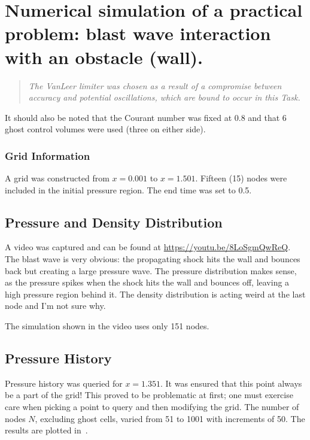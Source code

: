 
\section{Numerical simulation of a practical problem: blast wave interaction with an obstacle (wall).}

\begin{quote}
\em \centering The VanLeer limiter was chosen as a result of a compromise between accuracy and potential oscillations, which are bound to occur in this Task.
\end{quote}
It should also be noted that the Courant number was fixed at 0.8 and that 6 ghost control volumes were used (three on either side).

\subsubsection{Grid Information}
A grid was constructed from $x=0.001$ to $x=1.501$. Fifteen (15) nodes were included in the initial pressure region. The end time was set to 0.5.

\subsection{Pressure and Density Distribution}

A video was captured and can be found at \url{https://youtu.be/8LoSgmQwReQ}. The blast wave is very obvious: the propagating shock hits the wall and bounces back but creating a large pressure wave. The pressure distribution makes sense, as the pressure spikes when the shock hits the wall and bounces off, leaving a high pressure region behind it. The density distribution is acting weird at the last node and I'm not sure why.

The simulation shown in the video uses only 151 nodes.

\subsection{Pressure History}
Pressure history was queried for $x=1.351$. It was ensured that this point always be a part of the grid! This proved to be problematic at first; one must exercise care when picking a point to query and then modifying the grid. The number of nodes $N$, excluding ghost cells, varied from 51 to 1001 with increments of 50. The results are plotted in~.

